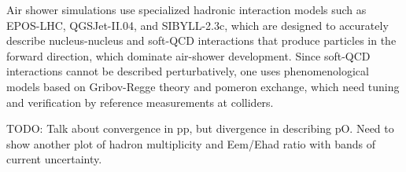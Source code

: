 \documentclass[../report.tex]{subfiles}
\begin{document}
Air shower simulations use specialized hadronic interaction models such as EPOS-LHC\cite{Werner:2005jf}, \mbox{QGSJet-II.04}\cite{Ostapchenko:2010vb}, and SIBYLL-2.3c\cite{Riehn:2017mfm}, which are designed to accurately describe nucleus-nucleus and soft-QCD interactions that produce particles in the forward direction, which dominate air-shower development. Since soft-QCD interactions cannot be described perturbatively, one uses phenomenological models based on Gribov-Regge theory and pomeron exchange, which need tuning and verification by reference measurements at colliders.

TODO: Talk about convergence in pp, but divergence in describing pO. Need to show another plot of hadron multiplicity and Eem/Ehad ratio with bands of current uncertainty.
\end{document}
